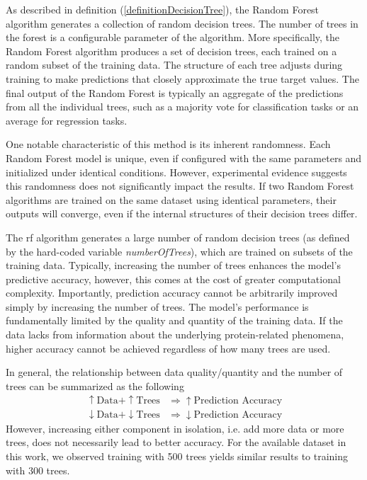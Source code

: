\documentclass[11pt]{article}
\begin{document}
As described in definition (\ref{definitionDecisionTree}), the Random Forest algorithm generates a collection of random decision trees. The number of trees in the forest is a configurable parameter of the algorithm. More specifically, the Random Forest algorithm produces a set of decision trees, each trained on a random subset of the training data. The structure of each tree adjusts during training to make predictions that closely approximate the true target values. The final output of the Random Forest is typically an aggregate of the predictions from all the individual trees, such as a majority vote for classification tasks or an average for regression tasks. \par

One notable characteristic of this method is its inherent randomness. Each Random Forest model is unique, even if configured with the same parameters and initialized under identical conditions. However, experimental evidence suggests this randomness does not significantly impact the results. If two Random Forest algorithms are trained on the same dataset using identical parameters, their outputs will converge, even if the internal structures of their decision trees differ.

The \gls{rf} algorithm generates a large number of random decision trees (as defined by the hard-coded variable \emph{numberOfTrees}), which are trained on subsets of the training data. Typically, increasing the number of trees enhances the model’s predictive accuracy, however, this comes at the cost of greater computational complexity. Importantly, prediction accuracy cannot be arbitrarily improved simply by increasing the number of trees. The model’s performance is fundamentally limited by the quality and quantity of the training data. If the data lacks from information about the underlying protein-related phenomena, higher accuracy cannot be achieved regardless of how many trees are used.

In general, the relationship between data quality/quantity and the number of trees can be summarized as the following
\begin{align*}
\uparrow\text{Data} + \uparrow\text{Trees} &\Rightarrow \uparrow\text{Prediction Accuracy} \\
\downarrow\text{Data} + \downarrow\text{Trees} &\Rightarrow \downarrow\text{Prediction Accuracy}
\end{align*}
However, increasing either component in isolation, i.e. add more data or more trees, does not necessarily lead to better accuracy. For the available dataset in this work, we observed training with 500 trees yields similar results to training with 300 trees.
\end{document}
